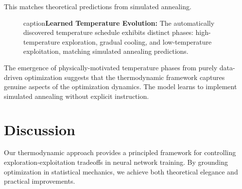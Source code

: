 \documentclass[12pt,a4paper]{article}
\begin{document}
This matches theoretical predictions from simulated annealing.

\begin{figure}[htbp]
\centering
{}
caption{\textbf{Learned Temperature Evolution:} The automatically 
         discovered temperature schedule exhibits distinct phases: 
         high-temperature exploration, gradual cooling, and low-temperature 
         exploitation, matching simulated annealing predictions.}
\label{fig:temperature_evolution}
\end{figure}

The emergence of physically-motivated temperature phases from purely data-driven optimization suggests that the thermodynamic framework captures genuine aspects of the optimization dynamics. The model learns to implement simulated annealing without explicit instruction.

\section{Discussion}

Our thermodynamic approach provides a principled framework for controlling exploration-exploitation tradeoffs in neural network training. By grounding optimization in statistical mechanics, we achieve both theoretical elegance and practical improvements.
\end{document}
